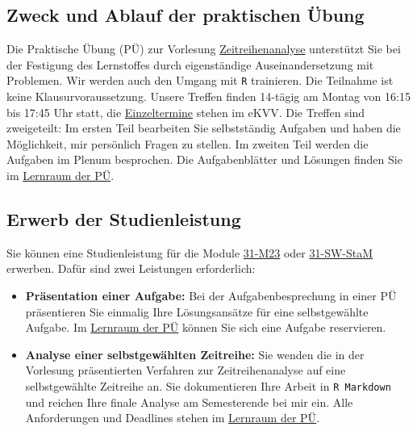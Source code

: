 
\ifcomment\else
\subsection*{Zweck und Ablauf der praktischen Übung}

Die Praktische Übung (PÜ) zur Vorlesung \href{https://ekvv.uni-bielefeld.de/kvv_publ/publ/vd?id=389104149}{Zeitreihenanalyse} unterstützt Sie bei der Festigung des Lernstoffes durch eigenständige Auseinandersetzung mit Problemen. Wir werden auch den Umgang mit \texttt{R} trainieren. Die Teilnahme ist keine Klausurvoraussetzung. Unsere Treffen finden 14-tägig am Montag von 16:15 bis 17:45 Uhr statt, die \href{https://ekvv.uni-bielefeld.de/kvv_publ/publ/Veranstaltung_Termine.jsp?id=388066971}{Einzeltermine} stehen im eKVV. Die Treffen sind zweigeteilt: Im ersten Teil bearbeiten Sie selbstständig Aufgaben und haben die Möglichkeit, mir persönlich Fragen zu stellen. Im zweiten Teil werden die Aufgaben im Plenum besprochen. Die Aufgabenblätter und Lösungen finden Sie im \href{https://moodle.uni-bielefeld.de/course/view.php?id=1035}{Lernraum der PÜ}.

\subsection*{Erwerb der Studienleistung}

Sie können eine Studienleistung für die Module \href{https://ekvv.uni-bielefeld.de/sinfo/publ/modul/26802869}{31-M23} oder \href{https://ekvv.uni-bielefeld.de/sinfo/publ/modul/47135019}{31-SW-StaM} erwerben. Dafür sind zwei Leistungen erforderlich:

\begin{itemize}
    \item \textbf{Präsentation einer Aufgabe:} Bei der Aufgabenbesprechung in einer PÜ präsentieren Sie einmalig Ihre Lösungsansätze für eine selbstgewählte Aufgabe. Im \href{https://moodle.uni-bielefeld.de/course/view.php?id=1035}{Lernraum der PÜ} können Sie sich eine Aufgabe reservieren.
    \item \textbf{Analyse einer selbstgewählten Zeitreihe:} Sie wenden die in der Vorlesung präsentierten Verfahren zur Zeitreihenanalyse auf eine selbstgewählte Zeitreihe an. Sie dokumentieren Ihre Arbeit in \texttt{R Markdown} und reichen Ihre finale Analyse am Semesterende bei mir ein. Alle Anforderungen und Deadlines stehen im \href{https://moodle.uni-bielefeld.de/course/view.php?id=1035}{Lernraum der PÜ}.
\end{itemize}
\fi


